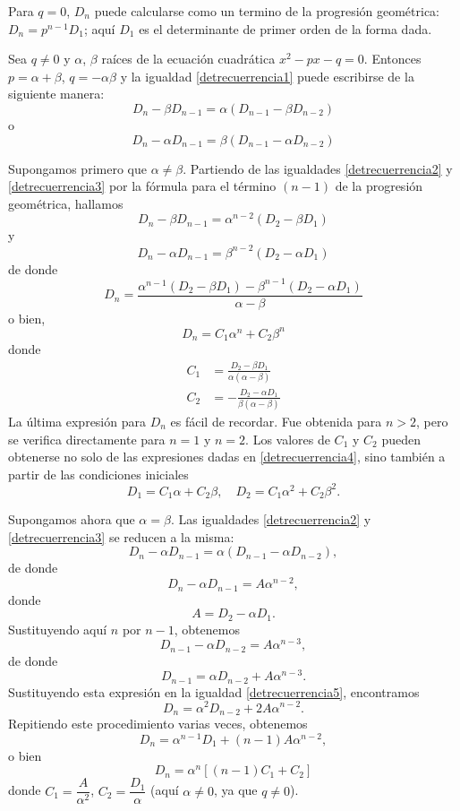 Para $q = 0$, $D_n$ puede calcularse como un termino de la progresión geométrica: $D_n = p^{n-1}D_1$; aquí $D_1$ es el determinante de primer orden de la forma dada.

\newpage

Sea $q \neq 0$ y $\alpha$, $\beta$ raíces de la ecuación cuadrática $x^2 - px - q=0$. Entonces $p = \alpha + \beta$, $q = -\alpha \beta$ y la igualdad \eqref{detrecuerrencia1} puede escribirse de la siguiente manera:
\begin{equation}
    D_n - \beta D_{n-1} = \alpha (D_{n-1} - \beta D_{n-2}) \label{detrecuerrencia2}
\end{equation}
o
\begin{equation}
    D_n - \alpha D_{n-1} = \beta (D_{n-1} - \alpha D_{n-2}) \label{detrecuerrencia3}
\end{equation}

Supongamos primero que $\alpha \neq \beta$. Partiendo de las igualdades \eqref{detrecuerrencia2} y \eqref{detrecuerrencia3} por la fórmula para el término $(n - 1)$ de la progresión geométrica, hallamos
$$D_n - \beta D_{n-1} = \alpha^{n-2} (D_2 - \beta D_1)$$
y
$$D_n - \alpha D_{n-1} = \beta^{n-2}(D_2 - \alpha D_1)$$
de donde
$$D_n = \frac{\alpha^{n-1}(D_2 - \beta D_1) - \beta^{n-1}(D_2 - \alpha D_1)}{\alpha - \beta}$$
o bien,
$$D_n = C_1 \alpha^n + C_2 \beta^n$$
donde
\begin{equation}
    \begin{aligned}
        C_1 & = \frac{D_2 - \beta D_1}{\alpha (\alpha - \beta)} \\
        C_2 & = -\frac{D_2 - \alpha D_1}{\beta (\alpha - \beta)}
    \end{aligned} \label{detrecuerrencia4}
\end{equation}
La última expresión para $D_n$ es fácil de recordar. Fue obtenida para $n > 2$, pero se verifica directamente para $n = 1$ y $n = 2$. Los valores de $C_1$ y $C_2$ pueden obtenerse no solo de las expresiones dadas en \eqref{detrecuerrencia4}, sino también a partir de las condiciones iniciales
$$D_1 = C_1 \alpha + C_2 \beta, \quad D_2 = C_1 \alpha^2 + C_2 \beta^2.$$

Supongamos ahora que $\alpha = \beta$. Las igualdades \eqref{detrecuerrencia2} y \eqref{detrecuerrencia3} se reducen a la misma:
$$D_n - \alpha D_{n-1} = \alpha (D_{n-1} - \alpha D_{n-2}),$$
de donde
\begin{equation}
    D_n - \alpha D_{n-1} = A \alpha^{n-2}, \label{detrecuerrencia5}
\end{equation}
donde
$$A = D_2 - \alpha D_1.$$
Sustituyendo aquí $n$ por $n-1$, obtenemos  
$$D_{n-1} - \alpha D_{n-2} = A \alpha^{n-3},$$
de donde
$$D_{n-1} = \alpha D_{n-2} + A \alpha^{n-3}.$$
Sustituyendo esta expresión en la igualdad \eqref{detrecuerrencia5}, encontramos
$$D_n = \alpha^2 D_{n-2} + 2A \alpha^{n-2}.$$
Repitiendo este procedimiento varias veces, obtenemos
$$D_n = \alpha^{n-1} D_1 + (n-1) A \alpha^{n-2},$$
o bien
$$D_n = \alpha^n \left[ (n-1) C_1 + C_2 \right]$$
donde $C_1 = \dfrac{A}{\alpha^2}$, $C_2 = \dfrac{D_1}{\alpha}$ (aquí $\alpha \neq 0$, ya que $q \neq 0$).

